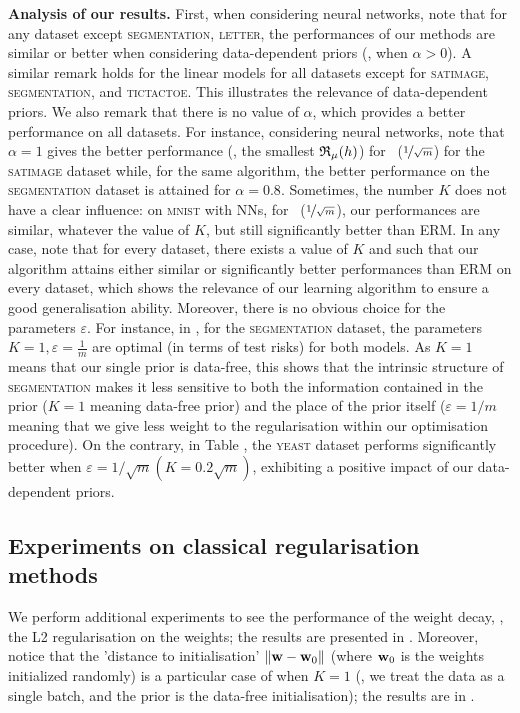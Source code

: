 \documentclass{article}
\begin{document}
\textbf{Analysis of our results.}
First, when considering neural networks, note that for any dataset except \textsc{segmentation}, \textsc{letter}, the performances of our methods are similar or better when considering data-dependent priors (\ie, when $\alpha >0$).
A similar remark holds for the linear models for all datasets except for \textsc{satimage}, \textsc{segmentation}, and \textsc{tictactoe}. This illustrates the relevance of data-dependent priors.
We also remark that there is no value of $\alpha$, which provides a better performance on all datasets.
For instance, considering neural networks, note that $\alpha=1$ gives the better performance (\ie, the smallest $\mathfrak{R}_\mu(h)$) for ~($\nicefrac{1}{\sqrt{m}}$) for the \textsc{satimage} dataset while, for the same algorithm, the better performance on the \textsc{segmentation} dataset is attained for $\alpha=0.8$. 
Sometimes, the number $K$ does not have a clear influence: on \textsc{mnist} with NNs, for ~($\nicefrac{1}{\sqrt{m}}$), our performances are similar, whatever the value of $K$, but still significantly better than ERM.
In any case, note that for every dataset, there exists a value of $K$ and such that our algorithm attains either similar or significantly better performances than ERM on every dataset, which shows the relevance of our learning algorithm to ensure a good generalisation ability.
Moreover, there is no obvious choice for the parameters $\varepsilon$.
For instance, in , for the \textsc{segmentation} dataset, the parameters $K=1,\varepsilon=\frac{1}{m}$ are optimal (in terms of test risks) for both models. 
As $K=1$ means that our single prior is data-free, this shows that the intrinsic structure of \textsc{segmentation} makes it less sensitive to both the information contained in the prior ($K=1$ meaning data-free prior) and the place of the prior itself ($\varepsilon=1/m$ meaning that we give less weight to the regularisation within our optimisation procedure).
On the contrary, in Table , the \textsc{yeast} dataset performs significantly better when $\varepsilon=1/\sqrt{m} (K=0.2\sqrt{m})$, exhibiting a positive impact of our data-dependent priors.

\subsection{Experiments on classical regularisation methods}

We perform additional experiments to see the performance of the weight decay, \ie, the L2 regularisation on the weights; the results are presented in .
Moreover, notice that the 'distance to initialisation' $\|\mathbf{w}-\mathbf{w}_0\|$ (where $\mathbf{w}_0$ is the weights initialized randomly) is a particular case of  when $K=1$ (\ie, we treat the data as a single batch, and the prior is the data-free initialisation); the results are in .
\end{document}
